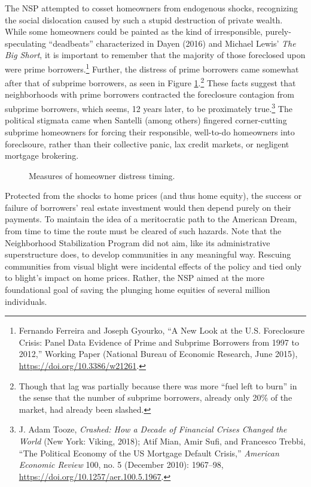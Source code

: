 \documentclass[12pt,oneside]{psthesis}
\begin{document}
The NSP attempted to cosset homeowners from endogenous shocks, recognizing the social dislocation caused by such a stupid destruction of private wealth.
While some homeowners could be painted as the kind of irresponsible, purely-speculating ``deadbeats'' characterized in Dayen (2016) and Michael Lewis' \emph{The Big Short}, it is important to remember that the majority of those foreclosed upon were prime borrowers.\footnote{Fernando Ferreira and Joseph Gyourko, ``A New Look at the U.S. Foreclosure Crisis: Panel Data Evidence of Prime and Subprime Borrowers from 1997 to 2012,'' Working Paper (National Bureau of Economic Research, June 2015), \url{https://doi.org/10.3386/w21261}.}
Further, the distress of prime borrowers came somewhat after that of subprime borrowers, as seen in Figure \ref{fig:distress}.\footnote{Though that lag was partially because there was more ``fuel left to burn'' in the sense that the number of subprime borrowers, already only 20\% of the market, had already been slashed.}
These facts suggest that neighborhoods with prime borrowers contracted the foreclosure contagion from subprime borrowers, which seems, 12 years later, to be proximately true.\footnote{J. Adam Tooze, \emph{Crashed: How a Decade of Financial Crises Changed the World} (New York: Viking, 2018); Atif Mian, Amir Sufi, and Francesco Trebbi, ``The Political Economy of the US Mortgage Default Crisis,'' \emph{American Economic Review} 100, no. 5 (December 2010): 1967--98, \url{https://doi.org/10.1257/aer.100.5.1967}.}
The political stigmata came when Santelli (among others) fingered corner-cutting subprime homeowners for forcing their responsible, well-to-do homeowners into foreclsoure, rather than their collective panic, lax credit markets, or negligent mortgage brokering.
\begin{figure}

{\centering {}

}

\caption{Measures of homeowner distress timing.}\label{fig:distress}
\end{figure}
Protected from the shocks to home prices (and thus home equity), the success or failure of borrowers' real estate investment would then depend purely on their payments.
To maintain the idea of a meritocratic path to the American Dream, from time to time the route must be cleared of such hazards.
Note that the Neighborhood Stabilization Program did not aim, like its administrative superstructure does, to develop communities in any meaningful way.
Rescuing communities from visual blight were incidental effects of the policy and tied only to blight's impact on home prices.
Rather, the NSP aimed at the more foundational goal of saving the plunging home equities of several million individuals.
\end{document}

